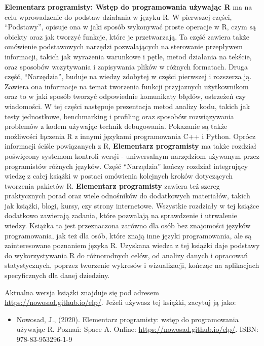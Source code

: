 \documentclass[paper=6in:9in,pagesize=pdftex,headinclude=on,footinclude=on,10pt]{scrbook}
\providecommand{\tightlist}{%
  \setlength{\itemsep}{0pt}\setlength{\parskip}{0pt}}
\begin{document}
\textbf{Elementarz programisty: Wstęp do programowania używając R} ma na celu wprowadzenie do podstaw działania w języku R.
W pierwszej części, ``Podstawy'', opisuje ona w jaki sposób wykonywać proste operacje w R, czym są obiekty oraz jak tworzyć funkcje, które je przetwarzają.
Ta część zawiera także omówienie podstawowych narzędzi pozwalających na sterowanie przepływem informacji, takich jak wyrażenia warunkowe i pętle, metod działania na tekście, oraz sposobów wczytywania i zapisywania plików w różnych formatach.
Druga część, ``Narzędzia'', buduje na wiedzy zdobytej w części pierwszej i rozszerza ją.
Zawiera ona informacje na temat tworzenia funkcji przyjaznych użytkownikom oraz to w jaki sposób tworzyć odpowiednie komunikaty błędów, ostrzeżeń czy wiadomości.
W tej części następuje prezentacja metod analizy kodu, takich jak testy jednostkowe, benchmarking i profiling oraz sposobów rozwiązywania problemów z kodem używając technik debugowania.
Pokazanie są także możliwości łączenia R z innymi językami programowania C++ i Python.
Oprócz informacji ściśle powiązanych z R, \textbf{Elementarz programisty} ma także rozdział poświęcony systemom kontroli wersji - uniwersalnym narzędziom używanym przez programistów różnych języków.
Część ``Narzędzia'' kończy rozdział integrujący wiedzę z całej książki w postaci omówienia kolejnych kroków dotyczących tworzenia pakietów R.
\textbf{Elementarz programisty} zawiera też szereg praktycznych porad oraz wiele odnośników do dodatkowych materiałów, takich jak książki, blogi, kursy, czy strony internetowe.
Wszystkie rozdziały w tej książce dodatkowo zawierają zadania, które pozwalają na sprawdzenie i utrwalenie wiedzy.
Książka ta jest przeznaczona zarówno dla osób bez znajomości języków programowania, jak też dla osób, które znają inne języki programowania, ale są zainteresowane poznaniem języka R.
Uzyskana wiedza z tej książki daje podstawy do wykorzystywania R do różnorodnych celów, od analizy danych i opracowań statystycznych, poprzez tworzenie wykresów i wizualizacji, kończąc na aplikacjach specyficznych dla danej dziedziny.

Aktualna wersja książki znajduje się pod adresem \url{https://nowosad.github.io/elp/}.
Jeżeli używasz tej książki, zacytuj ją jako:

\begin{itemize}
\tightlist
\item
  Nowosad, J., (2020). Elementarz programisty: wstęp do programowania używając R. Poznań: Space A. Online: \url{https://nowosad.github.io/elp/}. ISBN: 978-83-953296-1-9
\end{itemize}
\end{document}
